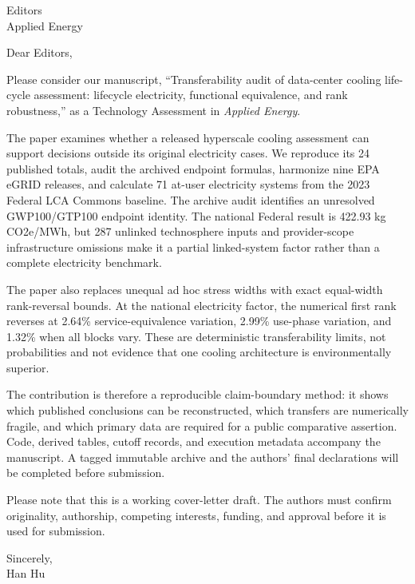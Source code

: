 \documentclass[11pt]{letter}
\begin{document}
\begin{letter}{Editors\\Applied Energy}
\opening{Dear Editors,}

Please consider our manuscript, ``Transferability audit of data-center cooling
life-cycle assessment: lifecycle electricity, functional equivalence, and rank
robustness,'' as a Technology Assessment in \emph{Applied Energy}.

The paper examines whether a released hyperscale cooling assessment can support
decisions outside its original electricity cases. We reproduce its 24 published
totals, audit the archived endpoint formulas, harmonize nine EPA eGRID releases,
and calculate 71 at-user electricity systems from the 2023 Federal LCA Commons
baseline. The archive audit identifies an unresolved GWP100/GTP100 endpoint
identity. The national Federal result is 422.93 kg CO2e/MWh, but 287 unlinked
technosphere inputs and provider-scope infrastructure omissions make it a
partial linked-system factor rather than a complete electricity benchmark.

The paper also replaces unequal ad hoc stress widths with exact equal-width
rank-reversal bounds. At the national electricity factor, the numerical first
rank reverses at 2.64\% service-equivalence variation, 2.99\% use-phase
variation, and 1.32\% when all blocks vary. These are deterministic
transferability limits, not probabilities and not evidence that one cooling
architecture is environmentally superior.

The contribution is therefore a reproducible claim-boundary method: it shows
which published conclusions can be reconstructed, which transfers are
numerically fragile, and which primary data are required for a public
comparative assertion. Code, derived tables, cutoff records, and execution
metadata accompany the manuscript. A tagged immutable archive and the authors'
final declarations will be completed before submission.

Please note that this is a working cover-letter draft. The authors must confirm
originality, authorship, competing interests, funding, and approval before it is
used for submission.

\closing{Sincerely,\\Han Hu}
\end{letter}
\end{document}
